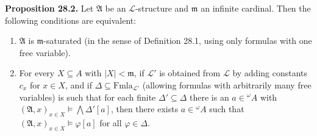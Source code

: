 \textbf{Proposition 28.2.}
Let $\mathfrak{A}$ be an $\mathcal{L}$-structure and $\mathfrak{m}$ an infinite cardinal. Then the following conditions are equivalent:
\begin{enumerate}
\item[(i)] $\mathfrak{A}$ is $\mathfrak{m}$-saturated (in the sense of Definition 28.1, using only formulas with one free variable).
\item[(ii)] For every $X \subseteq A$ with $|X| < \mathfrak{m}$, if $\mathcal{L}'$ is obtained from $\mathcal{L}$ by adding constants $c_x$ for $x \in X$, and if $\Delta \subseteq \mathrm{Fmla}_{\mathcal{L}'}$ (allowing formulas with arbitrarily many free variables) is such that for each finite $\Delta' \subseteq \Delta$ there is an $a \in {}^\omega A$ with $(\mathfrak{A}, x)_{x \in X} \models \bigwedge \Delta'[a]$, then there exists $a \in {}^\omega A$ such that $(\mathfrak{A}, x)_{x \in X} \models \varphi[a]$ for all $\varphi \in \Delta$.
\end{enumerate}

